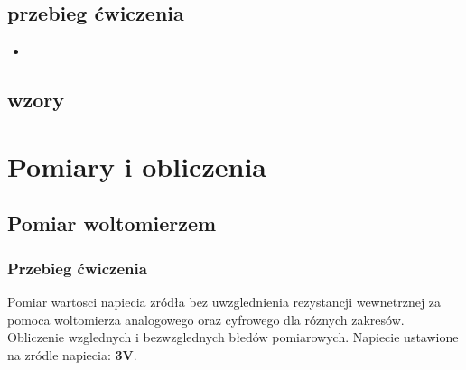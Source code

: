 \documentclass{extarticle}  %
\begin{document}
        \subsection{przebieg ćwiczenia}
            \begin{itemize}
                \item 
                
            \end{itemize}
        \subsection{wzory}

    \section{Pomiary i obliczenia}
        \subsection{Pomiar woltomierzem}
            \subsubsection{Przebieg ćwiczenia}
                Pomiar wartosci napiecia zródła bez uwzglednienia rezystancji wewnetrznej za
                pomoca woltomierza analogowego oraz cyfrowego dla róznych
                zakresów. Obliczenie wzglednych i bezwzglednych błedów pomiarowych.
                Napiecie ustawione na zródle napiecia: \textbf{3V}.
            
\end{document}
